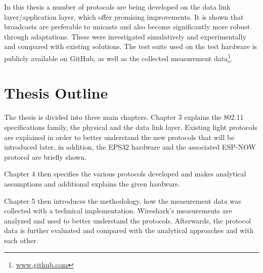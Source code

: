 In this thesis a number of protocols are being developed on the data link layer/application layer,
which offer promising improvements.
It is shown that broadcasts are preferable to unicasts
and also become significantly more robust through adaptations.
These were investigated simulatively and experimentally and compared with existing solutions.
The test suite used on the test hardware is publicly available on GitHub,
as well as the collected measurement data\footnote{\url{www.github.com}}.

\section*{Thesis Outline}

The thesis is divided into three main chapters.
Chapter 3 explains the 802.11 specifications family, the physical and the data link layer.
Existing light protocols are explained in order to better understand the new protocols that will be introduced later,
in addition, the EPS32 hardware and the associated ESP-NOW protocol are briefly shown.

Chapter 4 then specifies the various protocols developed and makes analytical assumptions and
additional explains the given hardware.

Chapter 5 then introduces the methodology, how the measurement data was collected with a technical implementation.
Wireshark's measurements are analyzed and used to better understand the protocols.
Afterwards, the protocol data is further evaluated and compared with the analytical approaches and with each other.